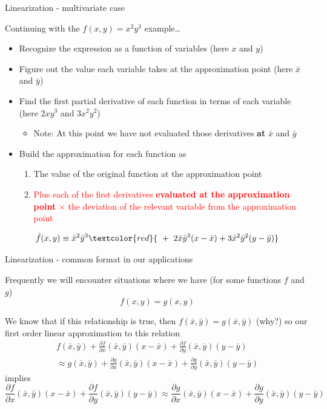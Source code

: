 \begin{frame}{Linearization - multivariate case}

Continuing with the $f(x,y) = x^{2} y^{3}$ example\ldots

\begin{itemize}
\item	Recognize the expression as a function of variables (here $x$ and $y$)
\item	Figure out the value each variable takes at the approximation point (here $\bar{x}$ and $\bar{y}$)
\item	Find the first partial derivative of each function in terms of each variable (here $2xy^{3}$ and $3x^{2}y^{2}$)
	\begin{itemize}
	\item	Note: At this point we have not evaluated those derivatives \textbf{at} $\bar{x}$ and $\bar{y}$
	\end{itemize}
\item	Build the approximation for each function as
	\begin{enumerate}
	\item	The value of the original function at the approximation point
	\item	\textcolor{red}{Plus each of the first derivatives \textbf{evaluated at the approximation point} $\times$ the deviation of the relevant variable from the approximation point}
	\end{enumerate}
\end{itemize}
\[
 \hat{f}(x,y) \equiv \bar{x}^{2} \bar{y}^{3} \textcolor{red}{\text{ }+\text{ }2\bar{x}\bar{y}^{3}(x-\bar{x}) + 3\bar{x}^{2}\bar{y}^{2}(y-\bar{y})}
\]
\end{frame}



\begin{frame}{Linearization - common format in our applications}

Frequently we will encounter situations where we have (for some functions $f$ and $g$)
\[
f(x,y) = g(x,y)
\]

\vspace{3mm}
We know that if this relationship is true, then $f(\bar{x},\bar{y})=g(\bar{x},\bar{y})$ (why?) so our first order linear approximation to this relation
\begin{eqnarray*}
f(\bar{x},\bar{y}) + \frac{\partial f}{\partial x}(\bar{x},\bar{y})(x-\bar{x}) + \frac{\partial f}{\partial y}(\bar{x},\bar{y})(y-\bar{y}) \\ \approx g(\bar{x},\bar{y}) + \frac{\partial g}{\partial x}(\bar{x},\bar{y})(x-\bar{x}) + \frac{\partial g}{\partial y}(\bar{x},\bar{y})(y-\bar{y})
\end{eqnarray*}
implies
\[
\frac{\partial f}{\partial x}(\bar{x},\bar{y})(x-\bar{x}) + \frac{\partial f}{\partial y}(\bar{x},\bar{y})(y-\bar{y}) \approx \frac{\partial g}{\partial x}(\bar{x},\bar{y})(x-\bar{x}) + \frac{\partial g}{\partial y}(\bar{x},\bar{y})(y-\bar{y})
\]

\end{frame}


